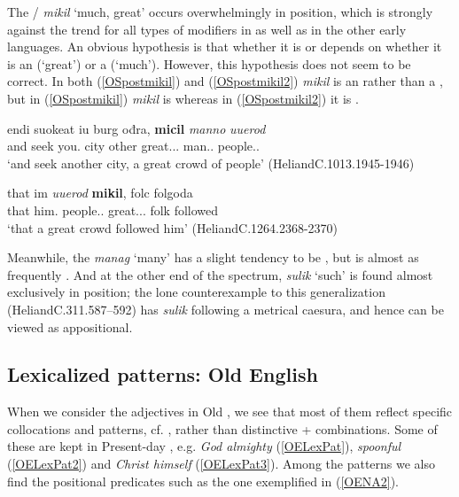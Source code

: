 \documentclass[output=paper,colorlinks,citecolor=brown,draft]{langscibook}
\begin{document}
The / \textit{mikil} ‘much, great’ occurs overwhelmingly in  position, which is strongly against the trend for all types of modifiers in  as well as in the other early  languages. An obvious hypothesis is that whether it is  or  depends on whether it is an  (‘great’) or a  (‘much’). However, this hypothesis does not seem to be correct. In both (\ref{OSpostmikil}) and (\ref{OSpostmikil2}) \textit{mikil} is an  rather than a , but in (\ref{OSpostmikil}) \textit{mikil} is  whereas in (\ref{OSpostmikil2}) it is . 

\ea\label{OSpostmikil}
\gll endi suokeat iu burg ođra, \textbf{micil} \textit{manno} \textit{uuerod}\\
and seek you.\DAT{} city other great.\ACC.\SG.\STR{} man.\GEN.\PL{} people.\ACC.\SG{}\\
\glt ‘and seek another city, a great crowd of people' (HeliandC.1013.1945-1946)
\z

\ea\label{OSpostmikil2}
\gll that im \textit{uuerod} \textbf{mikil}, folc folgoda\\
	that him.\DAT{} people.\NOM.\SG{} great.\NOM.\SG.\STR{} folk followed\\
\glt ‘that a great crowd followed him’ (HeliandC.1264.2368-2370)
\z

Meanwhile, the  \textit{manag} ‘many’ has a slight tendency to be , but is almost as frequently . And at the other end of the spectrum, \textit{sulik} ‘such’ is found almost exclusively in  position; the lone counterexample to this generalization (HeliandC.311.587–592) has \textit{sulik} following a metrical caesura, and hence can be viewed as appositional.

\subsection{Lexicalized patterns: Old English}\label{OELexDiff}

When we consider the  adjectives in Old , we see that most of them reflect specific collocations and  patterns, cf. , rather than distinctive  +  combinations.  Some of these are kept in Present-day , e.g. \textit{God almighty} (\ref{OELexPat}), \textit{spoonful} (\ref{OELexPat2}) and \textit{Christ himself} (\ref{OELexPat3}). Among the  patterns we also find the positional predicates such as the one exemplified in (\ref{OENA2}). 
\end{document}
